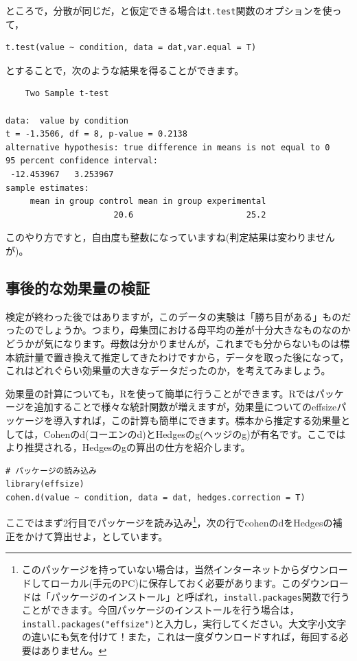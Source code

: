 \documentclass{ltjsbook}
\begin{document}
ところで，分散が同じだ，と仮定できる場合は\texttt{t.test}関数のオプションを使って，
\begin{lstlisting}
t.test(value ~ condition, data = dat,var.equal = T)
\end{lstlisting}
とすることで，次のような結果を得ることができます。
\begin{tcolorbox}
\begin{verbatim}
	Two Sample t-test

data:  value by condition
t = -1.3506, df = 8, p-value = 0.2138
alternative hypothesis: true difference in means is not equal to 0
95 percent confidence interval:
 -12.453967   3.253967
sample estimates:
     mean in group control mean in group experimental 
                      20.6                       25.2 \end{verbatim}
\end{tcolorbox}
このやり方ですと，自由度も整数になっていますね(判定結果は変わりませんが)。

\subsection{事後的な効果量の検証}
検定が終わった後ではありますが，このデータの実験は「勝ち目がある」ものだったのでしょうか。つまり，母集団における母平均の差が十分大きなものなのかどうかが気になります。母数は分かりませんが，これまでも分からないものは標本統計量で置き換えて推定してきたわけですから，データを取った後になって，これはどれぐらい効果量の大きなデータだったのか，を考えてみましょう。

効果量の計算についても，Rを使って簡単に行うことができます。Rではパッケージを追加することで様々な統計関数が増えますが，効果量についての\textsf{effsize}パッケージを導入すれば，この計算も簡単にできます。標本から推定する効果量としては，Cohenのd(コーエンのd)とHedgesのg(ヘッジのg)が有名です。ここではより推奨される，Hedgesのgの算出の仕方を紹介します。

\begin{lstlisting}
# パッケージの読み込み
library(effsize)
cohen.d(value ~ condition, data = dat, hedges.correction = T)
\end{lstlisting}
ここではまず2行目でパッケージを読み込み\footnote{このパッケージを持っていない場合は，当然インターネットからダウンロードしてローカル(手元のPC)に保存しておく必要があります。このダウンロードは「パッケージのインストール」と呼ばれ，\texttt{install.packages}関数で行うことができます。今回パッケージのインストールを行う場合は，\texttt{install.packages("effsize")}と入力し，実行してください。大文字小文字の違いにも気を付けて！また，これは一度ダウンロードすれば，毎回する必要はありません。}，次の行でcohenのdをHedgesの補正をかけて算出せよ，としています。
\end{document}

